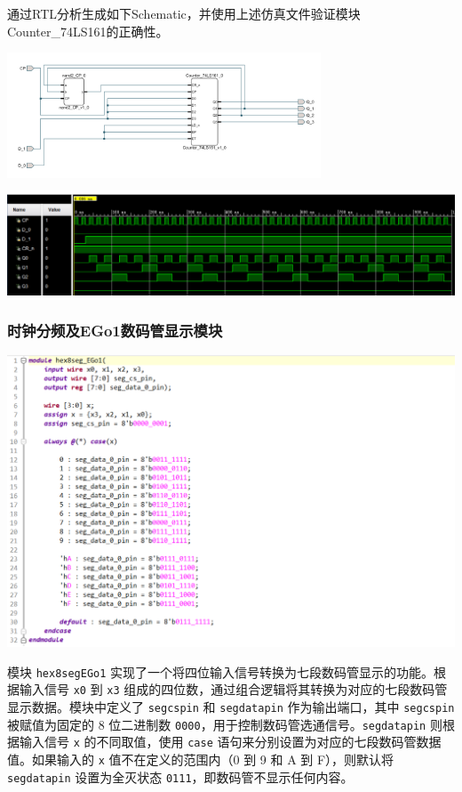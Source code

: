 \documentclass[a4,10pt,zihao=-4]{ctexart}
\begin{document}
通过RTL分析生成如下Schematic，并使用上述仿真文件验证模块 Counter\_74LS161的正确性。

\vspace{1em}
\noindent\includegraphics[width=0.7\textwidth]{Counter_74LS161_pic.png}

\noindent\includegraphics[width=1\textwidth]{sim_74LS161_sim.png}



\subsubsection{时钟分频及EGo1数码管显示模块}

\vspace{1em}
\noindent\includegraphics[width=1\textwidth]{hex8seg_EGo1_code.png}

模块 \texttt{hex8seg\textunderscore EGo1} 实现了一个将四位输入信号转换为七段数码管显示的功能。根据输入信号 \texttt{x0} 到 \texttt{x3} 组成的四位数，通过组合逻辑将其转换为对应的七段数码管显示数据。模块中定义了 \texttt{seg\textunderscore cs\textunderscore pin} 和 \texttt{seg\textunderscore data\textunderscore pin} 作为输出端口，其中 \texttt{seg\textunderscore cs\textunderscore pin} 被赋值为固定的 8 位二进制数 \texttt{0000}，用于控制数码管选通信号。\texttt{seg\textunderscore data\textunderscore pin} 则根据输入信号 \texttt{x} 的不同取值，使用 \texttt{case} 语句来分别设置为对应的七段数码管数据值。如果输入的 \texttt{x} 值不在定义的范围内（0 到 9 和 A 到 F），则默认将 \texttt{seg\textunderscore data\textunderscore pin} 设置为全灭状态 \texttt{0111}，即数码管不显示任何内容。
\end{document}
